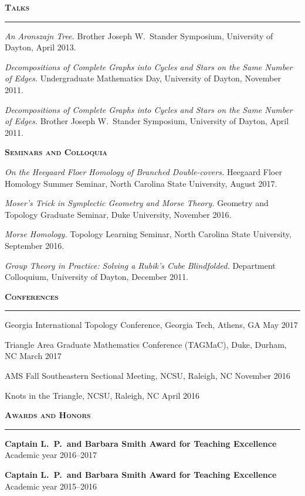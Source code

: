 \documentclass[10pt]{article}
\newcommand{\sect}[1]{
  \vspace{.75em}
  \textbf{\textsc{\Large #1}}

  \vspace{-1.5em}
  \noindent\rule{\textwidth}{.5pt}
  \vspace{-1.5em}
}
\begin{document}
\sect{Talks}

\setlength{\leftskip}{1em}

\emph{An Aronszajn Tree.} Brother Joseph W.\ Stander Symposium, University of
Dayton, April 2013.

\emph{Decompositions of Complete Graphs into Cycles and Stars on the Same Number
of Edges.} Undergraduate Mathematics Day, University of Dayton, November 2011.

\emph{Decompositions of Complete Graphs into Cycles and Stars on the Same Number
of Edges.} Brother Joseph W.\ Stander Symposium, University of Dayton, April
2011.

\setlength{\leftskip}{0em}

\vspace{.5em}
\textbf{\textsc{\large Seminars and Colloquia}}
\vspace{-.25em}

\setlength{\leftskip}{1em}

\emph{On the Heegaard Floer Homology of Branched Double-covers.} Heegaard Floer
Homology Summer Seminar, North Carolina State University, August 2017.

\emph{Moser's Trick in Symplectic Geometry and Morse Theory.} Geometry and
Topology Graduate Seminar, Duke University, November 2016.

\emph{Morse Homology.} Topology Learning Seminar, North Carolina State
University, September 2016.

\emph{Group Theory in Practice: Solving a Rubik's Cube Blindfolded.} Department
Colloquium, University of Dayton, December 2011.

\setlength{\leftskip}{0em}

\sect{Conferences}

Georgia International Topology Conference, Georgia Tech, Athens, GA \hfill May
2017\setlength{\parskip}{.25em}

Triangle Area Graduate Mathematics Conference (TAGMaC), Duke, Durham, NC \hfill
March 2017

AMS Fall Southeastern Sectional Meeting, NCSU, Raleigh, NC \hfill November 2016

Knots in the Triangle, NCSU, Raleigh, NC \hfill April 2016%
\setlength{\parskip}{.75em}

\newpage
\sect{Awards and Honors}

\textbf{Captain L.\ P.\ and Barbara Smith Award for Teaching
Excellence} \hfill Academic year 2016--2017\setlength{\parskip}{.25em}

\textbf{Captain L.\ P.\ and Barbara Smith Award for Teaching
Excellence} \hfill Academic year 2015--2016
\end{document}
